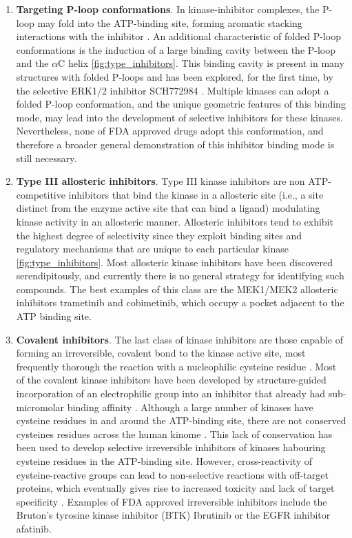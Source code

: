 \documentclass[12pt, b5paper,twoside]{tesi_upf}
\begin{document}
\begin{enumerate}
\item \textbf{Targeting P-loop conformations}. In kinase-inhibitor complexes, the P-loop may fold into the ATP-binding site, forming aromatic stacking interactions with the inhibitor \cite{Guimaraes2011}. An additional characteristic of folded P-loop conformations is the induction of a large binding cavity between the P-loop and the $\alpha$C helix \ref{fig:type_inhibitors}. This binding cavity is present in many structures with folded P-loops and has been explored, for the first time, by the selective ERK1/2 inhibitor SCH772984 \cite{Morris2013}. Multiple kinases can adopt a folded P-loop conformation, and the unique geometric features of this binding mode, may lead into the development of selective inhibitors for these kinases. Nevertheless, none of FDA approved drugs adopt this conformation, and therefore a broader general demonstration of this inhibitor binding mode is still necessary. 

\item \textbf{Type III allosteric inhibitors}. Type III kinase inhibitors are non ATP-competitive inhibitors that bind the kinase in a allosteric site (i.e., a site distinct from the enzyme active site that can bind a ligand) modulating kinase activity in an allosteric manner. Allosteric inhibitors tend to exhibit the highest degree of selectivity since they exploit binding sites and regulatory mechanisms that are unique to each particular kinase \ref{fig:type_inhibitors}. Most allosteric kinase inhibitors have been discovered serendipitously, and currently there is no general strategy for identifying such compounds. The best examples of this class are the MEK1/MEK2 allosteric inhibitors trametinib and cobimetinib, which occupy a pocket adjacent to the ATP binding site. 

\item \textbf{Covalent inhibitors}. The last class of kinase inhibitors are those capable of forming an irreversible, covalent bond to the kinase active site, most frequently thorough the reaction with a nucleophilic cysteine residue \cite{Cohen2005}. Most of the covalent kinase inhibitors have been developed by structure-guided incorporation of an electrophilic group into an inhibitor that already had sub-micromolar binding affinity \cite{Potashman2009}. Although a large number of kinases have cysteine residues in and around the ATP-binding site, there are not conserved cysteines residues across the human kinome \cite{Liu2013a}. This lack of conservation has been used to develop selective irreversible inhibitors of kinases habouring cysteine residues in the ATP-binding site. However, cross-reactivity of cysteine-reactive groups can lead to non-selective reactions with off-target proteins, which eventually gives rise to increased toxicity and lack of target specificity \cite{Barf2012, Liebler2008}. Examples of FDA approved irreversible inhibitors include the Bruton's tyrosine kinase inhibitor (BTK) Ibrutinib or the EGFR inhibitor afatinib.
 
 
\end{enumerate}  
 
\end{document}

